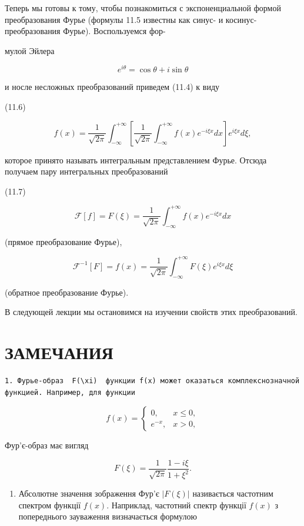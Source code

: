 \documentclass[
  ukrainian,
]{article}
\providecommand{\tightlist}{%
  \setlength{\itemsep}{0pt}\setlength{\parskip}{0pt}}
\begin{document}
Теперь мы готовы к тому, чтобы познакомиться с экспоненциальной формой
преобразования Фурье (формулы 11.5 известны как синус- и
косинус-преобразования Фурье). Воспользуемся фор-

мулой Эйлера

\[
e^{i\theta} = \cos \theta + i \sin \theta
\]

и носле несложных преобразований приведем (11.4) к виду

(11.6)

\[
f(x) = \frac{1}{\sqrt{2\pi}} \int_{-\infty}^{+\infty} \left[ \frac{1}{\sqrt{2\pi}} \int_{-\infty}^{+\infty} f(x) e^{-i\xi x} dx \right] e^{i\xi x} d\xi,
\]

которое принято называть интегральным представлением Фурье. Отсюда
получаем пару интегральных преобразований

(11.7)

\[
\mathcal{F}[f] = F(\xi) = \frac{1}{\sqrt{2\pi}} \int_{-\infty}^{+\infty} f(x) e^{-i\xi x} dx
\]

(прямое преобразование Фурье),

\[
\mathcal{F}^{-1}[F] = f(x) = \frac{1}{\sqrt{2\pi}} \int_{-\infty}^{+\infty} F(\xi) e^{i\xi x} d\xi
\]

(обратное преобразование Фурье).

В следующей лекции мы остановимся на изучении свойств этих
преобразований.

\section{ЗАМЕЧАНИЯ}\label{ux437ux430ux43cux435ux447ux430ux43dux438ux44f}

\begin{verbatim}
1. Фурье-образ  F(\xi)  функции f(x) может оказаться комплекснозначной функцией. Например, для функции
\end{verbatim}

\[
f(x) =
\begin{cases} 0, & x \le 0, \\ e^{-x}, & x > 0, \end{cases}
\]

Фур'є-образ має вигляд

\[
F(\xi) = \frac{1}{\sqrt{2\pi}} \frac{1 - i\xi}{1 + \xi^2}.
\]

\begin{enumerate}
\def\labelenumi{\arabic{enumi}.}
\setcounter{enumi}{1}
\tightlist
\item
  Абсолютне значення зображення Фур'є \(|F(\xi)|\) називається частотним
  спектром функції \(f(x)\). Наприклад, частотний спектр функції
  \(f(x)\) з попереднього зауваження визначається формулою
\end{enumerate}
\end{document}

